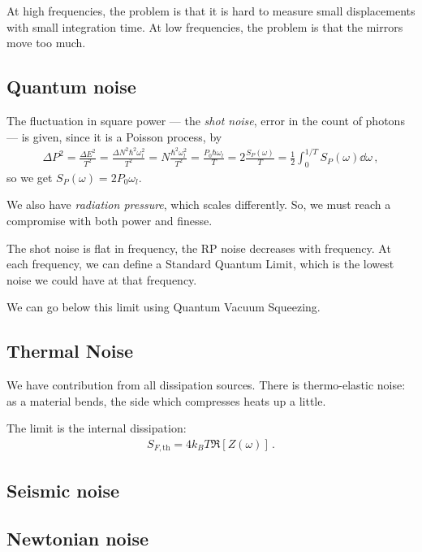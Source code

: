 \documentclass[main.tex]{subfiles}
\begin{document}
At high frequencies, the problem is that it is hard to measure small displacements with small integration time. 
At low frequencies, the problem is that the mirrors move too much. 

\subsection{Quantum noise}

The fluctuation in square power --- the \emph{shot noise}, error in the count of photons ---  is given, since it is a Poisson process, by
%
\begin{align}
\Delta P^2 = \frac{\Delta E^2}{T^2} = 
\frac{\Delta N^2 \hbar^2 \omega_{l}^2}{T^2}
= N \frac{\hbar^2   \omega_{l}^2}{T^2}
= \frac{P_0 \hbar \omega_{l}}{T}
= 2\frac{S_P(\omega )}{T}
= \frac{1}{2} \int_{0}^{1/T} S_P (\omega) \dd{\omega }
\,,
\end{align}
%
so we get \(S_P (\omega ) = 2 P_0 \omega_{l}\). 

We also have \emph{radiation pressure}, which scales differently. 
So, we must reach a compromise with both power and finesse. 

The shot noise is flat in frequency, the RP noise decreases with frequency. 
At each frequency, we can define a Standard Quantum Limit, which is the lowest noise we could have at that frequency. 

We can go below this limit using Quantum Vacuum Squeezing. 

\subsection{Thermal Noise}

We have contribution from all dissipation sources. 
There is thermo-elastic noise: as a material bends, the side which compresses heats up a little. 

The limit is the internal dissipation: 
%
\begin{align}
S_{F, \text{th}} = 4 k_B T \Re[Z(\omega )]  
\,.
\end{align}

\subsection{Seismic noise}

\subsection{Newtonian noise}
\end{document}
